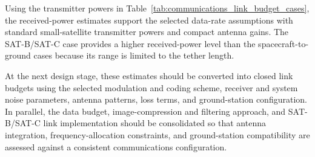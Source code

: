 \begin{table}[htbp]
\centering
\caption{Reference link-budget cases for the LINKU communications architecture.}
\label{tab:communications_link_budget_cases}
\small
{}
\end{table}

Using the transmitter powers in Table~\ref{tab:communications_link_budget_cases}, the received-power estimates support the selected data-rate assumptions with standard small-satellite transmitter powers and compact antenna gains. The SAT-B/SAT-C case provides a higher received-power level than the spacecraft-to-ground cases because its range is limited to the tether length.

At the next design stage, these estimates should be converted into closed link budgets using the selected modulation and coding scheme, receiver and system noise parameters, antenna patterns, loss terms, and ground-station configuration. In parallel, the data budget, image-compression and filtering approach, and SAT-B/SAT-C link implementation should be consolidated so that antenna integration, frequency-allocation constraints, and ground-station compatibility are assessed against a consistent communications configuration.



